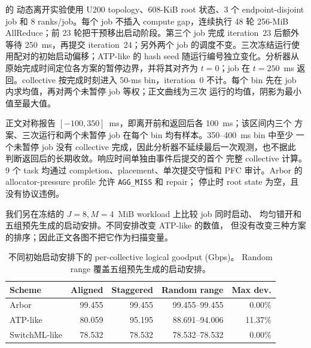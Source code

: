  的
动态离开实验使用 U200 topology、608-KiB root 状态、3 个 endpoint-disjoint
job 和 8 ranks/job。每个 job 不插入 compute gap，连续执行 48 轮
256-MiB AllReduce；前 23 轮把干预移出启动阶段。第三个 job
完成 iteration~23 后额外等待 250~ms，再提交 iteration~24；另外两个 job
的调度不变。三次冻结运行使用配对的初始启动偏移；ATP-like 的 hash seed
随运行编号独立变化。分析器从原始完成时间定位各方案的暂停边界，并将其对齐为
$t=0$；job 在 $t=250$~ms 返回。collective 按完成时刻进入 50-ms bin，iteration~0
不计。每个 bin 先在 job 内求均值，再对两个未暂停 job 等权；正文曲线为三次
运行的均值，阴影为最小值至最大值。

正文对称报告 $[-100,350]$~ms，即离开前和返回后各 100~ms；该区间内三个
方案、三次运行和两个未暂停 job 在每个 bin 均有样本。350--400~ms bin 中至少
一个未暂停 job 没有 collective 完成，因此分析器不延续最后一次观测，也不据此
判断返回后的长期收敛。响应时间单独由事件后提交的首个
完整 collective 计算。9 个 task 均通过 completion、placement、单次提交守恒和
PFC 审计。Arbor 的 allocator-pressure profile 允许 \texttt{AGG\_MISS} 和 repair；
停止时 root state 为空，且没有协议违例。

我们另在冻结的 $J=8,M=4$~MiB workload 上比较 job 同时启动、
均匀错开和五组预先生成的启动安排。不同安排改变 ATP-like 的数值，
但没有改变三种方案的排序；因此正文各图不把它作为扫描变量。

\begin{table}[t]
\centering
\small
\begin{tabular}{lrrrr}
\toprule
Scheme & Aligned & Staggered & Random range & Max dev. \\
\midrule
Arbor & 99.455 & 99.455 & 99.455--99.455 & 0.00\% \\
ATP-like & 80.059 & 95.195 & 88.691--94.006 & 11.37\% \\
SwitchML-like & 78.532 & 78.532 & 78.532--78.532 & 0.00\% \\
\bottomrule
\end{tabular}
\caption{不同初始启动安排下的 per-collective logical goodput (Gbps)。
Random range 覆盖五组预先生成的启动安排。}
\label{tab:g5-phase}
\end{table}
